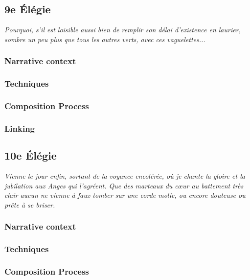 \documentclass[12pt,twoside,maitrise]{dms}
\theoremstyle{definition}
\begin{document}
\subsection{9e Élégie}

\epigraph{\textit{Pourquoi, s’il est loisible aussi bien de remplir son délai d’existence en laurier, sombre un peu plus que tous les autres verts, avec ces vaguelettes...}}{}

\subsubsection{Narrative context}

\subsubsection{Techniques}

\subsubsection{Composition Process}

\subsubsection{Linking}

\subsection{10e Élégie}

\epigraph{\textit{Vienne le jour enfin, sortant de la voyance encolérée, où je chante la gloire et la jubilation aux Anges qui l’agréent. Que des marteaux du cœur au battement très clair aucun ne vienne à faux tomber sur une corde molle, ou encore douteuse ou prête à se briser.}}{}

\subsubsection{Narrative context}

\subsubsection{Techniques}

\subsubsection{Composition Process}
\end{document}
